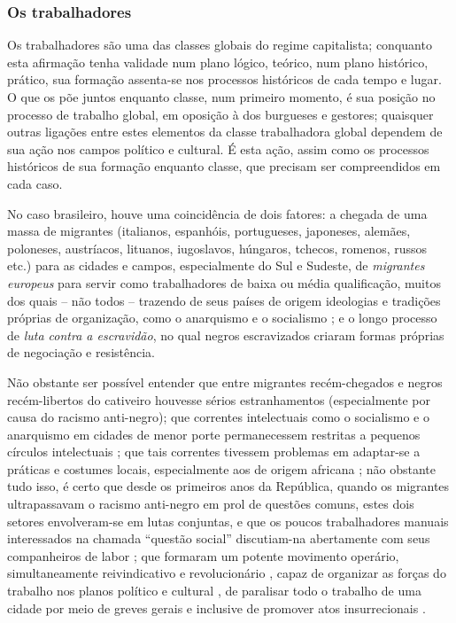 \subsubsection{Os trabalhadores}\label{subsubsec:clatrab}

Os trabalhadores são uma das classes globais do regime capitalista; conquanto esta afirmação tenha validade num plano lógico, teórico, num plano histórico, prático, sua formação assenta-se nos processos históricos de cada tempo e lugar. O que os põe juntos enquanto classe, num primeiro momento, é sua posição no processo de trabalho global, em oposição à dos burgueses e gestores; quaisquer outras ligações entre estes elementos da classe trabalhadora global dependem de sua ação nos campos político e cultural. É esta ação, assim como os processos históricos de sua formação enquanto classe, que precisam ser compreendidos em cada caso.

No caso brasileiro, houve uma coincidência de dois fatores: a chegada de uma massa de migrantes (italianos, espanhóis, portugueses, japoneses, alemães, poloneses, austríacos, lituanos, iugoslavos, húngaros, tchecos, romenos, russos etc.) para as cidades e campos, especialmente do Sul e Sudeste, de \textit{migrantes europeus} para servir como trabalhadores de baixa ou média qualificação, muitos dos quais -- não todos -- trazendo de seus países de origem ideologias e tradições próprias de organização, como o anarquismo e o socialismo \cite{petrone_imigra_1977}; e o longo processo de \textit{luta contra a escravidão}, no qual negros escravizados criaram formas próprias de negociação e resistência.

Não obstante ser possível entender que entre migrantes recém-chegados e negros recém-libertos do cativeiro houvesse sérios estranhamentos (especialmente por causa do racismo anti-negro); que correntes intelectuais como o socialismo e o anarquismo em cidades de menor porte permanecessem restritas a pequenos círculos intelectuais \cite{duarte_rebelde_1991}; que tais correntes tivessem problemas em adaptar-se a práticas e costumes locais, especialmente aos de origem africana \cite{goes_formacao_1988}; não obstante tudo isso, é certo que desde os primeiros anos da República, quando os migrantes ultrapassavam o racismo anti-negro em prol de questões comuns, estes dois setores envolveram-se em lutas conjuntas, e que os poucos trabalhadores manuais interessados na chamada ``questão social'' discutiam-na abertamente com seus companheiros de labor \cite[p.~73-85]{gomes_velhos_1988}; que formaram um potente movimento operário, simultaneamente reivindicativo e revolucionário \cite{samis_anabras_2004}, capaz de organizar as forças do trabalho nos planos político e cultural \cite{farinha_federa_2002,hardman_patripatr_2002}, de paralisar todo o trabalho de uma cidade por meio de greves gerais \cite{castellucci_salvador_2001,magnani_anarsp_1982} e inclusive de promover atos insurrecionais \cite{dulles_anacombras_1977,koval_prolbras_1982}. 

